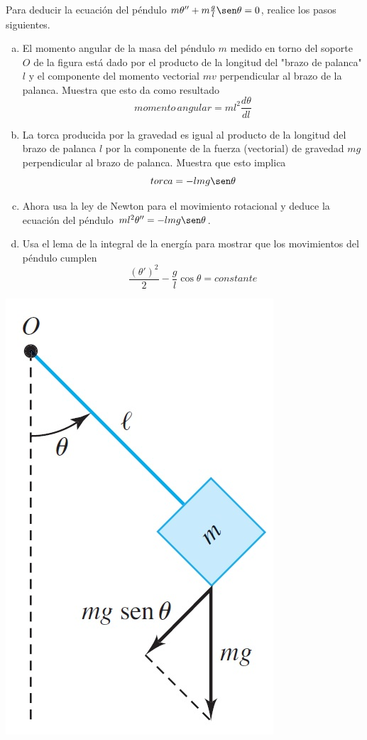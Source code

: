 \documentclass[12pt]{exam}
\begin{document}
    Para deducir la ecuación del péndulo $m\theta'' +m\frac{g}{l}\sen\theta=0$, realice los pasos siguientes.
    \begin{enumerate}[a)]
        \item El momento angular de la masa del péndulo $m$ medido en torno del soporte $O$ de la figura está dado por el producto de la longitud del 	"brazo de palanca"	$l$ y el componente
del momento vectorial $mv$ perpendicular al brazo de la palanca. Muestra que esto da como resultado $$momento\,angular=ml^2\frac{d\theta}{dl}$$
		\item La torca producida por la gravedad es igual al producto de la longitud del brazo de palanca $l$ por la componente de la fuerza (vectorial) de gravedad $mg$ perpendicular al brazo de palanca.
Muestra que esto implica $$torca=-lmg\sen\theta$$
		\item Ahora usa la ley de Newton para el movimiento rotacional y deduce la ecuación del péndulo $ml^2\theta''=-lmg\sen\theta$.
        
        \item Usa el lema de la integral de la energía para mostrar que los movimientos del péndulo cumplen $$\frac{(\theta')^2}{2}-\frac{g}{l}\cos\theta=constante$$

    \end{enumerate}
    \includegraphics[scale=.5]{T5Extra.jpg}
    
\end{document}
